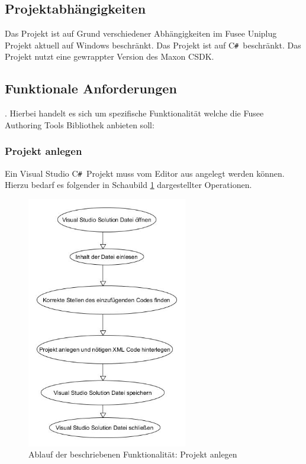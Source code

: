 \documentclass[pagesize, paper=a4, fontsize=12pt, titlepage=true, headings=small, headnosepline, abstractoff, liststotoc, nochapterprefix, plainheadsepline, twoside]{scrreprt}
\newcommand{\CSS}{C\texttt{\# }}
\newcommand{\CPP}{C\nolinebreak\hspace{-.05em}\raisebox{.4ex}{\tiny\bf +}\nolinebreak\hspace{-.10em}\raisebox{.4ex}{\tiny\bf +}}
\begin{document}
\subsection{Projektabhängigkeiten}
Das Projekt ist auf Grund verschiedener Abhängigkeiten im Fusee Uniplug Projekt aktuell auf Windows beschränkt.
Das Projekt ist auf \CSS beschränkt.
Das Projekt nutzt eine gewrappter Version des Maxon \CPP SDK.

\subsection{Funktionale Anforderungen}.
Hierbei handelt es sich um spezifische Funktionalität welche die Fusee Authoring Tools Bibliothek anbieten soll:

\subsubsection{Projekt anlegen}
Ein Visual Studio \CSS Projekt muss vom Editor aus angelegt werden können. Hierzu bedarf es folgender in Schaubild \ref{re:projektanlegen} dargestellter Operationen. 

\begin{figure}[ht]
	\centering
	\includegraphics[width=7cm]{Bilder/ProjektAnlegen.jpg}
	\caption{Ablauf der beschriebenen Funktionalität: Projekt anlegen}
	\label{re:projektanlegen}
\end{figure}
\end{document}
